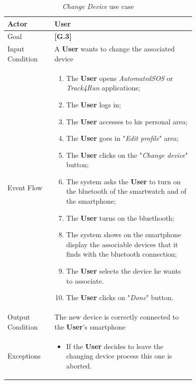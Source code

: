 \begin{center}
\begin{table}[H]
\begin{tabular}{ | l | p{0.75\linewidth} | }
  \hline
    Actor & \textbf{User} \\ \hline
    Goal & \textbf{[G.3]} \\ \hline
    Input Condition & A \textbf{User} wants to change the associated device\\ \hline
    Event Flow & \begin{minipage}[t]{0.7\textwidth}
      \begin{enumerate}
        \item The \textbf{User} opens \textit{AutomatedSOS} or \textit{Track4Run} applications;
        \item The \textbf{User} logs in;
        \item The \textbf{User} accesses to his personal area;
        \item The \textbf{User} goes in "\textit{Edit profile}" area;
        \item The \textbf{User} clicks on the "\textit{Change device}" button;
        \item The system asks the \textbf{User} to turn on the bluetooth of the smartwatch and of the smartphone;
        \item The \textbf{User} turns on the bluethooth;
        \item The system shows on the smartphone display the associable devices that it finds with the bluetooth connection;
        \item The \textbf{User} selects the device he wants to associate.
        \item The \textbf{User} clicks on "\textit{Done}" button.
      \end{enumerate}
    \smallskip
  \end{minipage} \\ \hline
  Output Condition & The new device is correctly connected to the \textbf{User}'s smartphone \\ \hline
  Exceptions & \begin{minipage}[t]{0.7\textwidth}
    \begin{itemize}
      \smallskip
      \item If the \textbf{User} decides to leave the changing device process this one is aborted.
    \end{itemize}
    \smallskip
  \end{minipage}  \\ \hline
\end{tabular}
\caption{\textit{Change Device} use case}
\label{table:changeDeviceTable}
\end{table}
\end{center}

